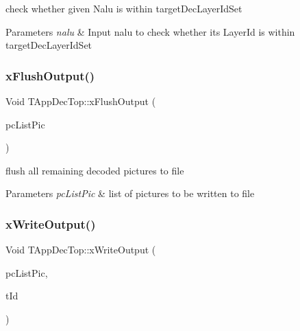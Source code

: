 check whether given Nalu is within target\+Dec\+Layer\+Id\+Set 


\begin{DoxyParams}{Parameters}
{\em nalu} & Input nalu to check whether its Layer\+Id is within target\+Dec\+Layer\+Id\+Set \\
\hline
\end{DoxyParams}
\mbox{\label{class_t_app_dec_top_abc0fd7b3dce420f7f6adc78b434087c2}} 
\subsubsection{\texorpdfstring{x\+Flush\+Output()}{xFlushOutput()}}
{\footnotesize\ttfamily Void T\+App\+Dec\+Top\+::x\+Flush\+Output (\begin{DoxyParamCaption}\item[{\hyperlink{class_t_com_list}{T\+Com\+List}$<$ \hyperlink{class_t_com_pic}{T\+Com\+Pic} $\ast$$>$ $\ast$}]{pc\+List\+Pic }\end{DoxyParamCaption})\hspace{0.3cm}{\ttfamily [protected]}}



flush all remaining decoded pictures to file 


\begin{DoxyParams}{Parameters}
{\em pc\+List\+Pic} & list of pictures to be written to file \\
\hline
\end{DoxyParams}
\mbox{\label{class_t_app_dec_top_af61c9ec5e471d49cf979288e60d8c65e}} 
\subsubsection{\texorpdfstring{x\+Write\+Output()}{xWriteOutput()}}
{\footnotesize\ttfamily Void T\+App\+Dec\+Top\+::x\+Write\+Output (\begin{DoxyParamCaption}\item[{\hyperlink{class_t_com_list}{T\+Com\+List}$<$ \hyperlink{class_t_com_pic}{T\+Com\+Pic} $\ast$$>$ $\ast$}]{pc\+List\+Pic,  }\item[{U\+Int}]{t\+Id }\end{DoxyParamCaption})\hspace{0.3cm}{\ttfamily [protected]}}



